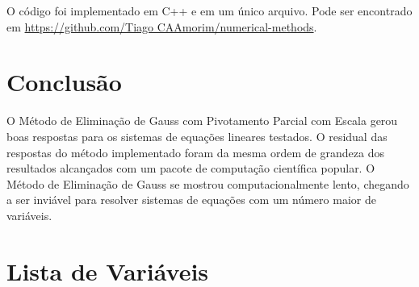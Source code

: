 \documentclass[final,5p]{elsarticle}
\numberwithin{equation}{section}
\begin{document}
        O código foi implementado em C++ e em um único arquivo. Pode ser encontrado em \href{https://github.com/TiagoCAAmorim/numerical-methods/blob/main/10_GaussElim/10_GaussElim.cpp}{https://github.com/Tiago CAAmorim/numerical-methods}.

    \section{Conclusão}

        O Método de Eliminação de Gauss com Pivotamento Parcial com Escala gerou boas respostas para os sistemas de equações lineares testados. O residual das respostas do método implementado foram da mesma ordem de grandeza dos resultados alcançados com um pacote de computação científica popular. O Método de Eliminação de Gauss se mostrou computacionalmente lento, chegando a ser inviável para resolver sistemas de equações com um número maior de variáveis.



\appendix

\section{Lista de Variáveis}
\end{document}
